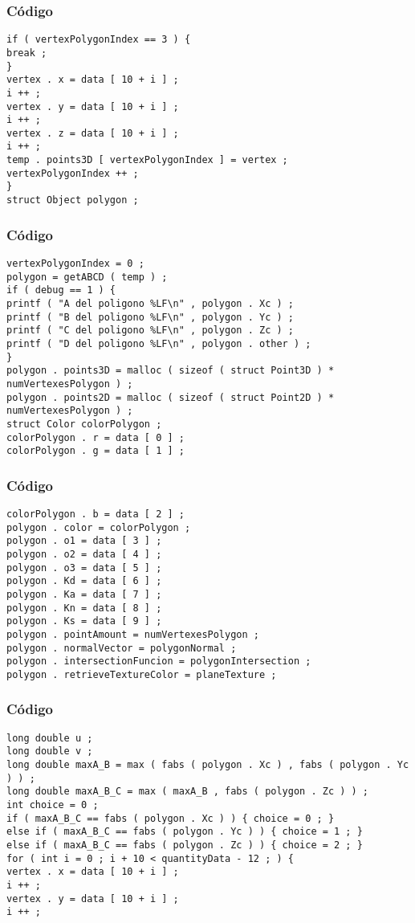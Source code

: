 \documentclass{beamer}
\begin{document}
\begin{frame}[fragile]
\frametitle{C\'odigo}
\begin{verbatim}
if ( vertexPolygonIndex == 3 ) { 
break ; 
} 
vertex . x = data [ 10 + i ] ; 
i ++ ; 
vertex . y = data [ 10 + i ] ; 
i ++ ; 
vertex . z = data [ 10 + i ] ; 
i ++ ; 
temp . points3D [ vertexPolygonIndex ] = vertex ; 
vertexPolygonIndex ++ ; 
} 
struct Object polygon ; 
\end{verbatim}
\end{frame}
\begin{frame}[fragile]
\frametitle{C\'odigo}
\begin{verbatim}
vertexPolygonIndex = 0 ; 
polygon = getABCD ( temp ) ; 
if ( debug == 1 ) { 
printf ( "A del poligono %LF\n" , polygon . Xc ) ; 
printf ( "B del poligono %LF\n" , polygon . Yc ) ; 
printf ( "C del poligono %LF\n" , polygon . Zc ) ; 
printf ( "D del poligono %LF\n" , polygon . other ) ; 
} 
polygon . points3D = malloc ( sizeof ( struct Point3D ) * numVertexesPolygon ) ; 
polygon . points2D = malloc ( sizeof ( struct Point2D ) * numVertexesPolygon ) ; 
struct Color colorPolygon ; 
colorPolygon . r = data [ 0 ] ; 
colorPolygon . g = data [ 1 ] ; 
\end{verbatim}
\end{frame}
\begin{frame}[fragile]
\frametitle{C\'odigo}
\begin{verbatim}
colorPolygon . b = data [ 2 ] ; 
polygon . color = colorPolygon ; 
polygon . o1 = data [ 3 ] ; 
polygon . o2 = data [ 4 ] ; 
polygon . o3 = data [ 5 ] ; 
polygon . Kd = data [ 6 ] ; 
polygon . Ka = data [ 7 ] ; 
polygon . Kn = data [ 8 ] ; 
polygon . Ks = data [ 9 ] ; 
polygon . pointAmount = numVertexesPolygon ; 
polygon . normalVector = polygonNormal ; 
polygon . intersectionFuncion = polygonIntersection ; 
polygon . retrieveTextureColor = planeTexture ; 
\end{verbatim}
\end{frame}
\begin{frame}[fragile]
\frametitle{C\'odigo}
\begin{verbatim}
long double u ; 
long double v ; 
long double maxA_B = max ( fabs ( polygon . Xc ) , fabs ( polygon . Yc ) ) ; 
long double maxA_B_C = max ( maxA_B , fabs ( polygon . Zc ) ) ; 
int choice = 0 ; 
if ( maxA_B_C == fabs ( polygon . Xc ) ) { choice = 0 ; } 
else if ( maxA_B_C == fabs ( polygon . Yc ) ) { choice = 1 ; } 
else if ( maxA_B_C == fabs ( polygon . Zc ) ) { choice = 2 ; } 
for ( int i = 0 ; i + 10 < quantityData - 12 ; ) { 
vertex . x = data [ 10 + i ] ; 
i ++ ; 
vertex . y = data [ 10 + i ] ; 
i ++ ; 
\end{verbatim}
\end{frame}
\end{document}
